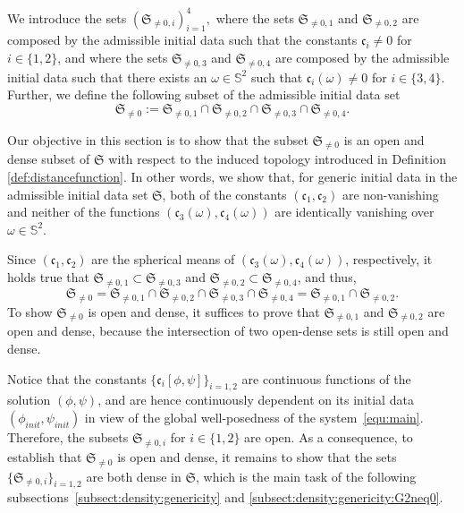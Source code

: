 \documentclass[a4paper,reqno]{amsart}
\theoremstyle{definition}
\numberwithin{equation}{section}
\def\cfrak{\mathfrak{c}}
\def\phiinit{\phi_{init}}
\def\psiinit{\psi_{init}}
\def\Sfrak{\mathfrak{S}}
\begin{document}
We introduce the sets
$
(\Sfrak_{\neq 0, i})_{i=1}^{4},
$
where the sets $\Sfrak_{\neq 0, 1}$ and $\Sfrak_{\neq 0, 2}$ are composed by the admissible initial data such that the constants $\cfrak_i\neq 0$ for $i\in \{1,2\}$, and where the sets $\Sfrak_{\neq 0, 3}$ and $\Sfrak_{\neq 0, 4}$ are composed by the admissible initial data such that there exists an $\omega\in\mathbb{S}^2$ such that $\cfrak_i(\omega)\neq 0$ for $i\in\{3,4\}$. Further, we define the following subset of the admissible initial data set
\begin{equation*}
\Sfrak_{\neq 0}:=\Sfrak_{\neq 0, 1}\cap \Sfrak_{\neq 0, 2}\cap\Sfrak_{\neq 0, 3}\cap \Sfrak_{\neq 0, 4}.
\end{equation*}

Our objective in this section is to show that the subset $\Sfrak_{\neq 0}$ is an open and dense subset of $\Sfrak$ with respect to the induced topology introduced in Definition \ref{def:distancefunction}. In other words, we show that, for generic initial data in the admissible initial data set $\Sfrak$, both of the constants $(\cfrak_1,\cfrak_{2})$ are non-vanishing and neither of the functions $(\cfrak_3(\omega),\cfrak_{4}(\omega))$ are identically vanishing over $\omega\in\mathbb{S}^2$.


\smallskip
Since $(\cfrak_{1},\cfrak_{2})$ are the spherical means of $(\cfrak_{3}(\omega),\cfrak_{4}(\omega))$, respectively, it holds true that  $\Sfrak_{\neq 0, 1}\subset \Sfrak_{\neq 0, 3}$ and $\Sfrak_{\neq 0, 2}\subset \Sfrak_{\neq 0, 4}$, and thus,
\begin{equation}\label{eq:1-11-sept-2025}
\Sfrak_{\neq 0} 
=\Sfrak_{\neq 0, 1}\cap \Sfrak_{\neq 0, 2}\cap\Sfrak_{\neq 0, 3}\cap \Sfrak_{\neq 0, 4}
= \Sfrak_{\neq 0, 1}\cap \Sfrak_{\neq 0, 2}.
\end{equation}
To show $\Sfrak_{\neq 0}$ is open and dense, it suffices to prove that $\Sfrak_{\neq 0, 1}$ and $\Sfrak_{\neq 0, 2}$ are open and dense, because the intersection of two open-dense sets is still open and dense.

Notice that the constants $\{\cfrak_i[\phi,\psi]\}_{i=1,2}$ are continuous functions of the solution $(\phi,\psi)$, and are hence continuously dependent on its initial data $(\phiinit,\psiinit)$ in view of the global well-posedness of the system~\eqref{equ:main}. Therefore, the subsets $\Sfrak_{\neq 0, i}$ for $i\in \{1,2\}$ are open. As a consequence, to establish that $\Sfrak_{\neq 0}$ is open and dense, it remains to show that the sets $\{\Sfrak_{\neq 0, i}\}_{i=1,2}$ are both dense in $\Sfrak$, which is the main task of the following subsections~\ref{subsect:density:genericity} and \ref{subsect:density:genericity:G2neq0}.
\end{document}
